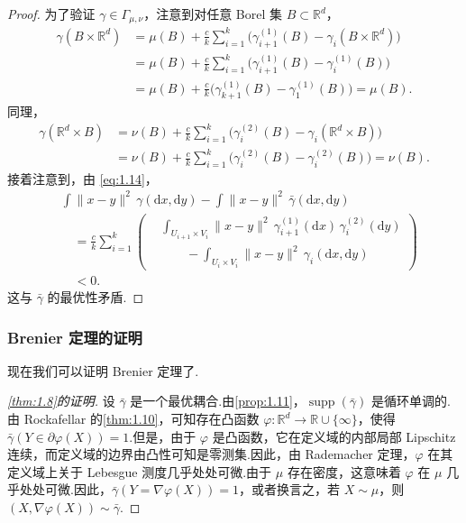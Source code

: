 \begin{proof}
为了验证 $\gamma\in\Gamma_{\mu,\nu}$，注意到对任意 Borel 集 $B\subset\mathbb R^d$，
$$
\begin{aligned}
\gamma(B\times\mathbb R^d)
&=\mu(B)+\frac ck\sum_{i=1}^k
  \bigl(\gamma_{i+1}^{(1)}(B)-\gamma_i(B\times\mathbb R^d)\bigr)\\
&=\mu(B)+\frac ck\sum_{i=1}^k
  \bigl(\gamma_{i+1}^{(1)}(B)-\gamma_i^{(1)}(B)\bigr)\\
&=\mu(B)+\frac ck\bigl(\gamma_{k+1}^{(1)}(B)-\gamma_1^{(1)}(B)\bigr)
=\mu(B).
\end{aligned}
$$
同理，
$$
\begin{aligned}
\gamma(\mathbb R^d\times B)
&=\nu(B)+\frac ck\sum_{i=1}^k
  \bigl(\gamma_i^{(2)}(B)-\gamma_i(\mathbb R^d\times B)\bigr)\\
&=\nu(B)+\frac ck\sum_{i=1}^k
  \bigl(\gamma_i^{(2)}(B)-\gamma_i^{(2)}(B)\bigr)=\nu(B).
\end{aligned}
$$
接着注意到，由 \eqref{eq:1.14}，
$$
\begin{aligned}
&\int\|x-y\|^2\,\gamma(\mathrm dx,\mathrm dy)
-\int\|x-y\|^2\,\bar\gamma(\mathrm dx,\mathrm dy)\\
&\quad=\frac ck\sum_{i=1}^k\left(
\begin{aligned}
&\int_{U_{i+1}\times V_i}\|x-y\|^2\,
\gamma_{i+1}^{(1)}(\mathrm dx)\,\gamma_i^{(2)}(\mathrm dy)\\
&\qquad-\int_{U_i\times V_i}\|x-y\|^2\,\gamma_i(\mathrm dx,\mathrm dy)
\end{aligned}\right)\\
&\quad<0.
\end{aligned}
$$
这与 $\bar\gamma$ 的最优性矛盾.
\end{proof}

\subsubsection{Brenier 定理的证明}\label{sec:1.4.3}

现在我们可以证明 Brenier 定理了.

\begin{proof}[\autoref{thm:1.8}的证明]

设 $\bar\gamma$ 是一个最优耦合.由\autoref{prop:1.11}，$\operatorname{supp}(\bar\gamma)$ 是循环单调的.由 Rockafellar 的\autoref{thm:1.10}，可知存在凸函数 $\varphi:\mathbb R^d\to\mathbb R\cup\{\infty\}$，使得 $\bar\gamma(Y\in\partial\varphi(X))=1$.但是，由于 $\varphi$ 是凸函数，它在定义域的内部局部 Lipschitz 连续，而定义域的边界由凸性可知是零测集.因此，由 Rademacher 定理，$\varphi$ 在其定义域上关于 Lebesgue 测度几乎处处可微.由于 $\mu$ 存在密度，这意味着 $\varphi$ 在 $\mu$ 几乎处处可微.因此，$\bar\gamma(Y=\nabla\varphi(X))=1$，或者换言之，若 $X\sim\mu$，则 $(X,\nabla\varphi(X))\sim\bar\gamma$.
\end{proof}
